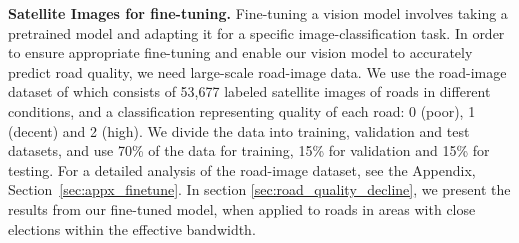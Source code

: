 {\bf Satellite Images for fine-tuning.} Fine-tuning a vision model involves taking a pretrained model and adapting it for a specific image-classification task. 
In order to ensure appropriate fine-tuning and enable our vision model to accurately predict road quality, we need large-scale road-image data. We use the road-image dataset of \cite{brewer2021} which consists of 53,677 labeled satellite images of roads in different conditions, and a classification representing quality of each road: 0 (poor), 1 (decent) and 2 (high). We divide the data into training, validation and test datasets, and use 70\% of the data for training, 15\% for validation and 15\% for testing. 
For a detailed analysis of the road-image dataset, see the Appendix, Section~\ref{sec:appx_finetune}.
In section \ref{sec:road_quality_decline}, we present the results from our fine-tuned model, when applied to roads in areas with close elections within the effective bandwidth. 


